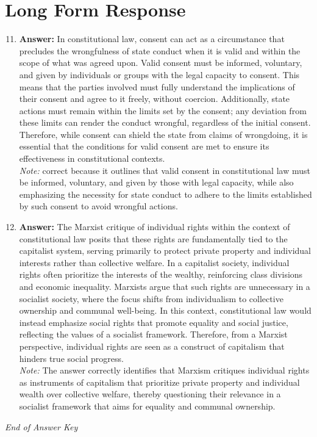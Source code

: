 \documentclass[12pt]{article}
\begin{document}
\section*{Long Form Response}
\begin{enumerate}[label=\arabic*.]
\setcounter{enumi}{10}
\item \textbf{Answer:} In constitutional law, consent can act as a circumstance that precludes the wrongfulness of state conduct when it is valid and within the scope of what was agreed upon. Valid consent must be informed, voluntary, and given by individuals or groups with the legal capacity to consent. This means that the parties involved must fully understand the implications of their consent and agree to it freely, without coercion. Additionally, state actions must remain within the limits set by the consent; any deviation from these limits can render the conduct wrongful, regardless of the initial consent. Therefore, while consent can shield the state from claims of wrongdoing, it is essential that the conditions for valid consent are met to ensure its effectiveness in constitutional contexts.
\\ \textit{Note:} correct because it outlines that valid consent in constitutional law must be informed, voluntary, and given by those with legal capacity, while also emphasizing the necessity for state conduct to adhere to the limits established by such consent to avoid wrongful actions.
\item \textbf{Answer:} The Marxist critique of individual rights within the context of constitutional law posits that these rights are fundamentally tied to the capitalist system, serving primarily to protect private property and individual interests rather than collective welfare. In a capitalist society, individual rights often prioritize the interests of the wealthy, reinforcing class divisions and economic inequality. Marxists argue that such rights are unnecessary in a socialist society, where the focus shifts from individualism to collective ownership and communal well-being. In this context, constitutional law would instead emphasize social rights that promote equality and social justice, reflecting the values of a socialist framework. Therefore, from a Marxist perspective, individual rights are seen as a construct of capitalism that hinders true social progress.
\\ \textit{Note:} The answer correctly identifies that Marxism critiques individual rights as instruments of capitalism that prioritize private property and individual wealth over collective welfare, thereby questioning their relevance in a socialist framework that aims for equality and communal ownership.
\end{enumerate}

\vfill
\noindent\textit{End of Answer Key}
\end{document}
